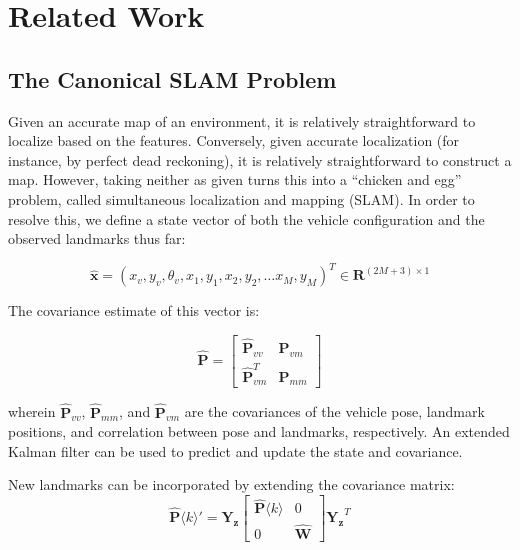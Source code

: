 \section{Related Work}

\subsection{The Canonical SLAM Problem}
Given an accurate map of an environment, it is relatively straightforward to localize based on the features. Conversely, given accurate localization (for instance, by perfect dead reckoning), it is relatively straightforward to construct a map. However, taking neither as given turns this into a ``chicken and egg'' problem, called simultaneous localization and mapping (SLAM). In order to resolve this, we define a state vector of both the vehicle configuration and the observed landmarks thus far: \cite{corke}

\begin{equation*}
    \hat{\mathbf{x}} = (x_v,y_v,\theta_v,x_1,y_1,x_2,y_2, \ldots x_M, y_M)^T \in \mathbf{R}^{(2M+3) \times 1 }
\end{equation*}

The covariance estimate of this vector is:

\begin{equation*}
    \hat{\mathbf{P}} = \begin{bmatrix}
        \hat{\mathbf{P}}_{vv} & \hat{\mathbf{P}}_{vm} \\
        \hat{\mathbf{P}}_{vm}^T & \hat{\mathbf{P}}_{mm}
    \end{bmatrix}
\end{equation*}

wherein $\hat{\mathbf{P}}_{vv}$, $ \hat{\mathbf{P}}_{mm}$, and $\hat{\mathbf{P}}_{vm}$ are the covariances of the vehicle pose, landmark positions, and correlation between pose and landmarks, respectively. An extended Kalman filter can be used to predict and update the state and covariance.

New landmarks can be incorporated by extending the covariance matrix:
\begin{equation*}
    \hat{\mathbf{P}}\langle k \rangle ' = \mathbf{Y_z}\begin{bmatrix}
        \hat{\mathbf{P}} \langle k \rangle & 0\\
        0 & \hat{\mathbf{W}}
    \end{bmatrix} \mathbf{Y_z}^T
\end{equation*}

